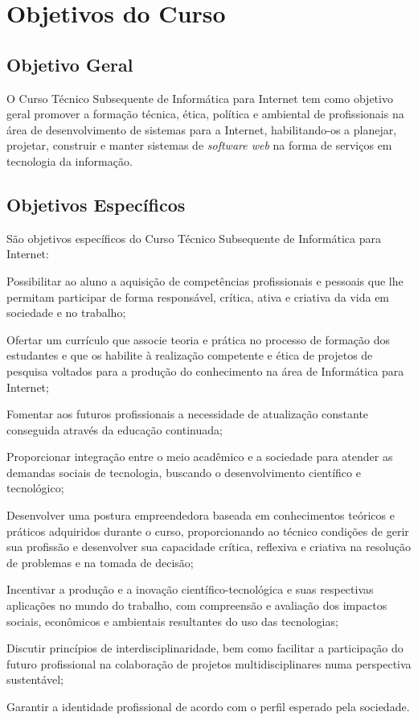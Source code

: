 \documentclass[
	12pt,				%
	openright,			%
	twoside,			%
	a4paper,			%
	chapter=TITLE,		%
	english,			%
	french,				%
	spanish,			%
	brazil,				%
	]{abntex2}
\begin{document}
\chapter{Objetivos do Curso}

\section{Objetivo Geral}


O Curso Técnico Subsequente de Informática para Internet tem como objetivo geral promover a formação técnica, ética, política e ambiental de profissionais na área de desenvolvimento de sistemas para a Internet, habilitando-os a planejar, projetar, construir e manter sistemas de \textit{software web} na forma de serviços em tecnologia da informação.


\section{Objetivos Específicos}

São objetivos específicos do Curso Técnico Subsequente de Informática para Internet:
\begin{alineas}
    \item Possibilitar ao aluno a aquisição de competências profissionais e pessoais que lhe permitam participar de forma responsável, crítica, ativa e criativa da vida em sociedade e no trabalho;
    \item  Ofertar um currículo que associe teoria e prática no processo de formação dos estudantes e que os habilite à realização competente e ética de projetos de pesquisa voltados para a produção do conhecimento na área de Informática para Internet;
    \item  Fomentar aos futuros profissionais a necessidade de atualização constante conseguida através da educação continuada;
    \item  Proporcionar integração entre o meio acadêmico e a sociedade para atender as demandas sociais de tecnologia, buscando o desenvolvimento científico e tecnológico;
    \item  Desenvolver uma postura empreendedora baseada em conhecimentos teóricos e práticos adquiridos durante o curso, proporcionando ao técnico condições de gerir sua profissão e desenvolver sua capacidade crítica, reflexiva e criativa na resolução de problemas e na tomada de decisão;
    \item  Incentivar a produção e a inovação científico-tecnológica e suas respectivas aplicações no mundo do trabalho, com compreensão e avaliação dos impactos sociais, econômicos e ambientais resultantes do uso das tecnologias;
    \item Discutir  princípios de interdisciplinaridade, bem como facilitar a participação do futuro profissional na colaboração de projetos multidisciplinares numa perspectiva sustentável;
    \item Garantir a identidade profissional de acordo com o perfil esperado pela sociedade.
\end{alineas}
\end{document}
